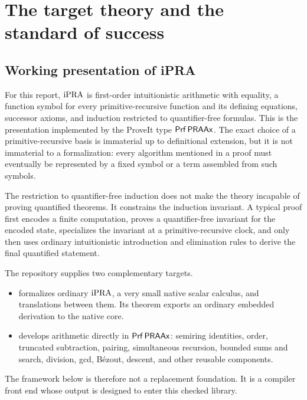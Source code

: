 \section{The target theory and the standard of success}
\label{sec:ipra-target}

\subsection{Working presentation of iPRA}

For this report, \(\mathrm{iPRA}\) is first-order intuitionistic arithmetic with equality, a
function symbol for every primitive-recursive function and its defining equations,
successor axioms, and induction restricted to quantifier-free formulas.  This is the
presentation implemented by the ProveIt type \(\mathsf{Prf}\,\mathsf{PRAAx}\).  The exact choice of a
primitive-recursive basis is immaterial up to definitional extension, but it is not
immaterial to a formalization: every algorithm mentioned in a proof must eventually
be represented by a fixed symbol or a term assembled from such symbols.

The restriction to quantifier-free induction does not make the theory incapable of
proving quantified theorems.  It constrains the induction invariant.  A typical proof
first encodes a finite computation, proves a quantifier-free invariant for the encoded
state, specializes the invariant at a primitive-recursive clock, and only then uses
ordinary intuitionistic introduction and elimination rules to derive the final
quantified statement.

The repository supplies two complementary targets.

\begin{itemize}
\item {} formalizes ordinary \(\mathrm{iPRA}\), a very small native scalar
calculus, and translations between them.  Its theorem  exports an
ordinary embedded derivation to the native core.
\item {} develops arithmetic directly in
\(\mathsf{Prf}\,\mathsf{PRAAx}\): semiring identities, order, truncated subtraction, pairing,
simultaneous recursion, bounded sums and search, division, gcd, B\'ezout, descent, and
other reusable components.
\end{itemize}

The framework below is therefore not a replacement foundation.  It is a compiler
front end whose output is designed to enter this checked library.

